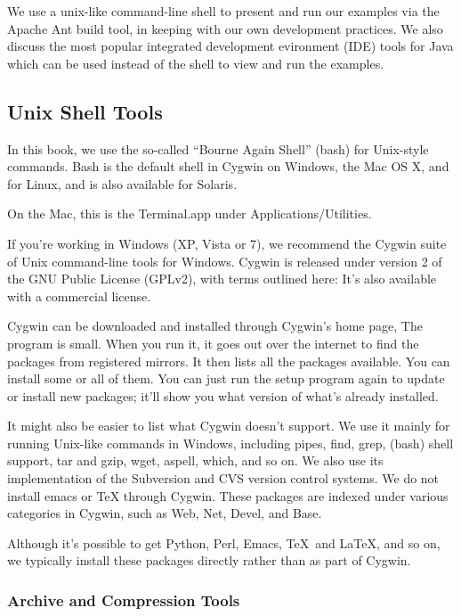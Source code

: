 We use a unix-like command-line shell to present and run our examples
via the Apache Ant build tool, in keeping with our own development
practices.  We also discuss the most popular integrated
development evironment (IDE) tools for Java which can be used
instead of the shell to view and run the examples.

\subsection{Unix Shell Tools}

In this book, we use the so-called ``Bourne Again Shell'' (bash) for
Unix-style commands.  Bash is the default shell in Cygwin on Windows,
the Mac OS X, and for Linux, and is also available for Solaris.

On the Mac, this is the Terminal.app under Applications/Utilities.

If you're working in Windows (XP, Vista or 7), we recommend the 
Cygwin suite of Unix command-line tools for Windows.  
Cygwin is released under version 2 of the GNU Public License (GPLv2), with
terms outlined here:
%
%
It's also available with a commercial license.

Cygwin can be downloaded and installed through Cygwin's home page,
%
%
The  program is small.  When you run it, it goes out
over the internet to find the packages from registered mirrors.  It
then lists all the packages available.  You can install some or all of
them.  You can just run the setup program again to update or install
new packages; it'll show you what version of what's already installed.

It might also be easier to list what Cygwin doesn't support.  We use
it mainly for running Unix-like commands in Windows, including pipes,
find, grep, (bash) shell support, tar and gzip, wget, aspell, which,
and so on.  We also use its implementation of the Subversion and CVS
version control systems.  We do not install emacs or TeX through
Cygwin.  These packages are indexed under various categories in
Cygwin, such as Web, Net, Devel, and Base.  

Although it's possible to get Python, Perl, Emacs, \TeX\ and \LaTeX,
and so on, we typically install these packages directly rather than
as part of Cygwin.

\subsubsection{Archive and Compression Tools}

